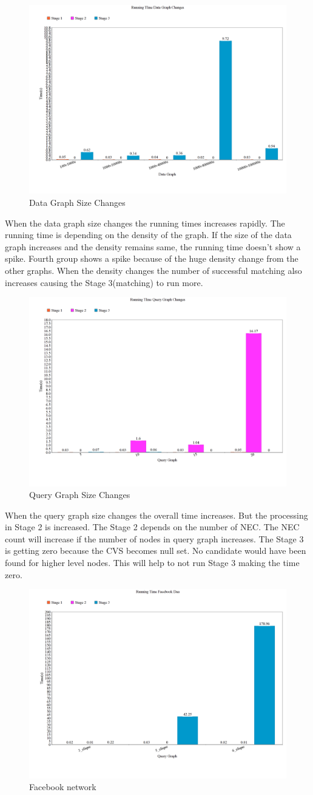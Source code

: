 \begin{figure}[h]
 \centering
\includegraphics[width=.5\textwidth]{Dchange.png}
 \caption{Data Graph Size Changes}
 \label{fig:dchange}
\end{figure}
\hspace{10mm} When the data graph size changes the running times increases rapidly. The running time is depending on the density of the graph. If the size of the data graph increases and the density remains same, the running time doesn't show a spike. Fourth group shows a spike because of the huge density change from the other graphs. When the density changes the number of successful matching also increases causing the Stage 3(matching) to run more. \\
\begin{figure}[h!]
 \centering
\includegraphics[width=.5\textwidth]{Qchange.png}
 \caption{Query Graph Size Changes}
 \label{fig:qchange}
\end{figure}
\hspace{10mm} When the query graph size changes the overall time increases. But the processing in Stage 2 is increased. The Stage 2 depends on the number of NEC. The NEC count will increase if the number of nodes in query graph increases. The Stage 3 is getting zero because the CVS becomes null set. No candidate would have been found for higher level nodes. This will help to not run Stage 3 making the time zero.\\
\begin{figure}[h!]
 \centering
\includegraphics[width=.5\textwidth]{fb.png}
 \caption{Facebook network}
 \label{fig:fb}
\end{figure}
